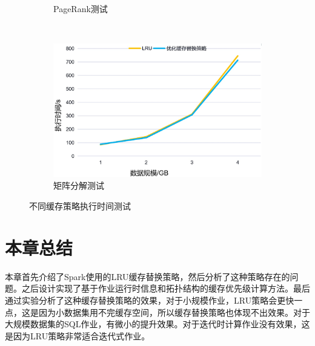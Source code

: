 \begin{figure}[!htbp]
\begin{subfigure}[b]{0.45\linewidth}
      \caption{PageRank测试}
      \label{fig:pagerank-cache}
    \end{subfigure}%
    ~%
    \begin{subfigure}[b]{0.45\linewidth}
      \includegraphics[width=\textwidth]{Img/mx4.jpg}
      \caption{矩阵分解测试}
      \label{fig:matrix-cache}
    \end{subfigure}
    \caption{不同缓存策略执行时间测试}
    \label{fig:cache-time}
\end{figure}


\section{本章总结}

本章首先介绍了Spark使用的LRU缓存替换策略，然后分析了这种策略存在的问题。之后设计实现了基于作业运行时信息和拓扑结构的缓存优先级计算方法。最后通过实验分析了这种缓存替换策略的效果，对于小规模作业，LRU策略会更快一点，这是因为小数据集用不完缓存空间，所以缓存替换策略也体现不出效果。对于大规模数据集的SQL作业，有微小的提升效果。对于迭代时计算作业没有效果，这是因为LRU策略非常适合迭代式作业。